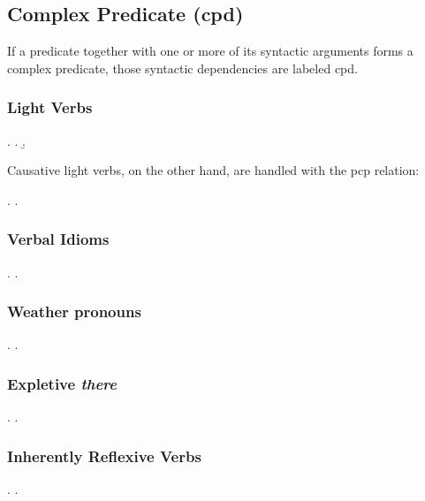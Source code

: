 \documentclass[a4paper]{article}
\begin{document}

\clearpage
\subsection{Complex Predicate (\textsf{cpd})}
\label{sec:cpd}

If a predicate together with one or more of its syntactic arguments forms a
complex predicate, those syntactic dependencies are labeled \textsf{cpd}.

\subsubsection{Light Verbs}

\ex.
\a. 
\b. 

Causative light verbs, on the other hand, are handled with the \textsf{pcp}
relation:

\ex.
\a. 

\subsubsection{Verbal Idioms}

\ex.
\a. 

\subsubsection{Weather pronouns}

\ex.
\a. 

\subsubsection{Expletive \emph{there}}

\ex.
\a. 

\subsubsection{Inherently Reflexive Verbs}

\ex.
\a. 

\end{document}
